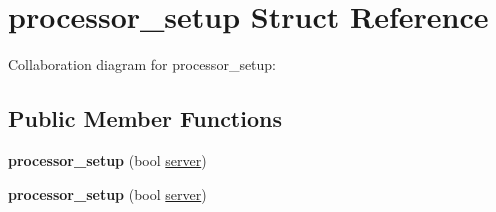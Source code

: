 \hypertarget{structprocessor__setup}{}\section{processor\+\_\+setup Struct Reference}
\label{structprocessor__setup}


Collaboration diagram for processor\+\_\+setup\+:
\subsection*{Public Member Functions}
\begin{DoxyCompactItemize}
\item 
\mbox{\label{structprocessor__setup_a760f623a2b8349aa21b8dd565b29e593}} 
{\bfseries processor\+\_\+setup} (bool \mbox{\hyperlink{classwebsocketpp_1_1server}{server}})
\item 
\mbox{\label{structprocessor__setup_a760f623a2b8349aa21b8dd565b29e593}} 
{\bfseries processor\+\_\+setup} (bool \mbox{\hyperlink{classwebsocketpp_1_1server}{server}})
\end{DoxyCompactItemize}
